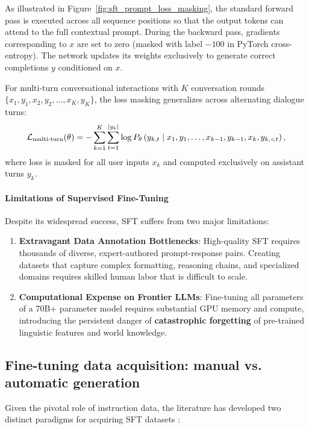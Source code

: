 \documentclass[../../../main.tex]{subfiles}
\begin{document}
As illustrated in Figure~\ref{fig:sft_prompt_loss_masking}, the standard forward pass is executed across all sequence positions so that the output tokens can attend to the full contextual prompt. During the backward pass, gradients corresponding to $x$ are set to zero (masked with label $-100$ in PyTorch cross-entropy). The network updates its weights exclusively to generate correct completions $y$ conditioned on $x$.

For multi-turn conversational interactions with $K$ conversation rounds $\{x_1, y_1, x_2, y_2, \dots, x_K, y_K\}$, the loss masking generalizes across alternating dialogue turns:
\begin{equation}
\label{eq:multiturn_sft_loss}
\mathcal{L}_{\text{multi-turn}}(\theta) = -\sum_{k=1}^K \sum_{t=1}^{|y_k|} \log P_\theta\left(y_{k, t} \;\middle|\; x_1, y_1, \dots, x_{k-1}, y_{k-1}, x_k, y_{k, <t}\right),
\end{equation}
where loss is masked for all user inputs $x_k$ and computed exclusively on assistant turns $y_k$.

\paragraph{Limitations of Supervised Fine-Tuning}
Despite its widespread success, SFT suffers from two major limitations:
\begin{enumerate}
    \item \textbf{Extravagant Data Annotation Bottlenecks}: High-quality SFT requires thousands of diverse, expert-authored prompt-response pairs. Creating datasets that capture complex formatting, reasoning chains, and specialized domains requires skilled human labor that is difficult to scale.
    \item \textbf{Computational Expense on Frontier LLMs}: Fine-tuning all parameters of a 70B+ parameter model requires substantial GPU memory and compute, introducing the persistent danger of \textbf{catastrophic forgetting} of pre-trained linguistic features and world knowledge.
\end{enumerate}

\subsection{Fine-tuning data acquisition: manual vs. automatic generation}
\label{subsec:sft_data_acquisition_taxonomy}

Given the pivotal role of instruction data, the literature has developed two distinct paradigms for acquiring SFT datasets \citep{xiao2025}:
\end{document}
